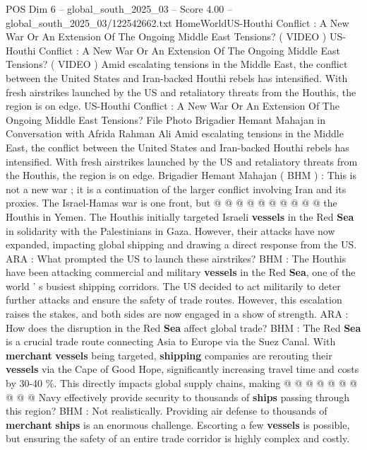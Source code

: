\begin{textsample}{POS Dim 6 – global\_south\_2025\_03 – Score 4.00 – global\_south\_2025\_03/122542662.txt}  \label{ex:f6_pos_313}
HomeWorldUS-Houthi Conflict : A New War Or An Extension Of The Ongoing Middle East Tensions? ( VIDEO ) US-Houthi Conflict : A New War Or An Extension Of The Ongoing Middle East Tensions? ( VIDEO ) Amid escalating tensions in the Middle East, the conflict between the United States and Iran-backed Houthi rebels has intensified.
With fresh airstrikes launched by the US and retaliatory threats from the Houthis, the region is on edge.
US-Houthi Conflict : A New War Or An Extension Of The Ongoing Middle East Tensions?
File Photo Brigadier Hemant Mahajan in Conversation with Afrida Rahman Ali Amid escalating tensions in the Middle East, the conflict between the United States and Iran-backed Houthi rebels has intensified.
With fresh airstrikes launched by the US and retaliatory threats from the Houthis, the region is on edge.
Brigadier Hemant Mahajan ( BHM ) : This is not a new war ; it is a continuation of the larger conflict involving Iran and its proxies.
The Israel-Hamas war is one front, but @ @ @ @ @ @ @ @ @ @ the Houthis in Yemen.
The Houthis initially targeted Israeli \textbf{vessels} in the Red \textbf{Sea} in solidarity with the Palestinians in Gaza.
However, their attacks have now expanded, impacting global shipping and drawing a direct response from the US.
ARA : What prompted the US to launch these airstrikes?
BHM : The Houthis have been attacking commercial and military \textbf{vessels} in the Red \textbf{Sea}, one of the world ' s busiest shipping corridors.
The US decided to act militarily to deter further attacks and ensure the safety of trade routes.
However, this escalation raises the stakes, and both sides are now engaged in a show of strength.
ARA : How does the disruption in the Red \textbf{Sea} affect global trade?
BHM : The Red \textbf{Sea} is a crucial trade route connecting Asia to Europe via the Suez Canal.
With \textbf{merchant} \textbf{vessels} being targeted, \textbf{shipping} companies are rerouting their \textbf{vessels} via the Cape of Good Hope, significantly increasing travel time and costs by 30-40 \%.
This directly impacts global supply chains, making @ @ @ @ @ @ @ @ @ @ Navy effectively provide security to thousands of \textbf{ships} passing through this region?
BHM : Not realistically.
Providing air defense to thousands of \textbf{merchant} \textbf{ships} is an enormous challenge.
Escorting a few \textbf{vessels} is possible, but ensuring the safety of an entire trade corridor is highly complex and costly.

\end{textsample}
